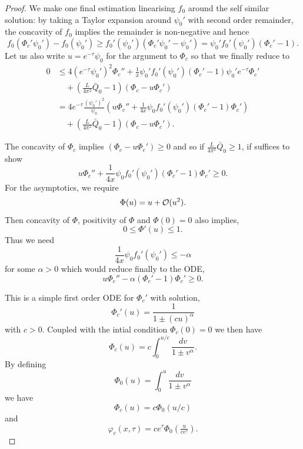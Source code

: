 \documentclass[12pt]{amsart}
\begin{document}
\begin{proof}
We make one final estimation linearising $f_0$ around the self similar solution: by taking a Taylor expansion around $\psi_0'$ with second order remainder, the concavity of $f_0$ implies the remainder is non-negative and hence
\[
f_0(\Phi_c' \psi_0') - f_0(\psi_0') \geq f_0'(\psi_0')(\Phi_c'\psi_0' - \psi_0') = \psi_0' f_0'(\psi_0')(\Phi_c' - 1).
\]
Let us also write $u = e^{-\tau} \psi_0$ for the argument to $\Phi_c$ so that we finally reduce to
\begin{equation}
\label{eq:Phi_ode}
\begin{split}
0 &\leq 4 (e^{-\tau} \psi_0')^2 \Phi_c'' + \frac{1}{x} \psi_0' f_0'(\psi_0')(\Phi_c' - 1) \psi_0' e^{-\tau} \Phi_c' \\
&\quad + \left(\frac{L}{4\pi^2} \bar{Q}_0 - 1\right) \left(\Phi_c - u \Phi_c'\right) \\
&= 4 e^{-\tau} \frac{(\psi_0')^2}{\psi_0} \left(u \Phi_c'' + \frac{1}{4x} \psi_0 f_0'(\psi_0')(\Phi_c' - 1) \Phi_c'\right) \\
&\quad + \left(\frac{L}{4\pi^2} \bar{Q}_0 - 1\right) \left(\Phi_c - u \Phi_c'\right).
\end{split}
\end{equation}

The concavity of $\Phi_c$ implies $\left(\Phi_c - u \Phi_c'\right) \geq 0$ and so if $\frac{L}{4\pi^2} \bar{Q}_0 \geq 1$, if suffices to show
\[
u \Phi_c'' + \frac{1}{4x} \psi_0 f_0'(\psi_0')(\Phi_c' - 1) \Phi_c' \geq 0.
\]
For the asymptotics, we require
\[
\Phi(u) = u + \operatorname{\mathcal{O}}(u^2).
\]
Then concavity of $\Phi$, positivity of $\Phi$ and $\Phi(0) = 0$ also implies,
\[
0 \leq \Phi'(u) \leq 1.
\]
Thus we need
\[
\frac{1}{4x} \psi_0 f_0'(\psi_0') \leq -\alpha
\]
for some $\alpha > 0$ which would reduce finally to the ODE,
\begin{equation}
\label{eq:comparison_ode}
u \Phi_c'' - \alpha (\Phi_c' - 1) \Phi_c' \geq 0.
\end{equation}

This is a simple first order ODE for $\Phi_c'$ with solution,
\[
\Phi_c'(u) = \frac{1}{1 \pm (cu)^{\alpha}}
\]
with $c > 0$. Coupled with the intial condition $\Phi_c(0) = 0$ we then have
\begin{equation}
\label{eq:Phi}
\Phi_c (u) = c \int_0^{u/c} \frac{dv}{1 \pm v^{\alpha}}.
\end{equation}
By defining
\[
\Phi_0(u) = \int_0^{u} \frac{dv}{1 \pm v^{\alpha}}
\]
we have
\[
\Phi_c(u) = c \Phi_0(u/c)
\]
and
\[
\varphi_c(x, \tau) = c e^{\tau} \Phi_0\left(\tfrac{u}{ce^{\tau}}\right).
\]


\end{proof}
\end{document}
